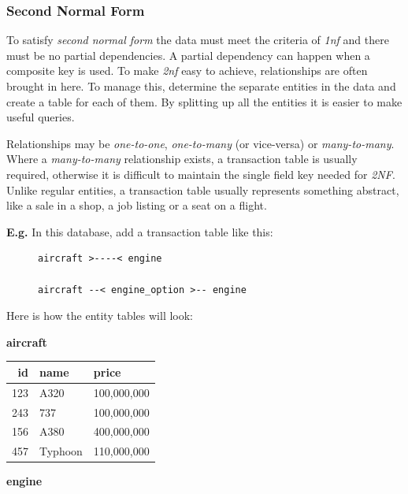 \documentclass[9pt]{article}
\begin{document}
\subsubsection{Second Normal Form}
\label{sec:orgafbaccc}

To satisfy \emph{second normal form} the data must meet  the criteria of \emph{1nf} and there must be no partial dependencies. A partial dependency can happen when a composite key is used. To make \emph{2nf} easy to achieve, relationships are often brought in here. To manage this, determine the separate entities in the data and create a table for each of them. By splitting up all the entities it is easier to make useful queries.

Relationships may be \emph{one-to-one}, \emph{one-to-many} (or vice-versa) or \emph{many-to-many}. Where a \emph{many-to-many} relationship exists, a transaction table is usually required, otherwise it is difficult to maintain the single field key needed for \emph{2NF}. Unlike regular entities, a transaction table usually represents something abstract, like a sale in a shop, a job listing or a seat on a flight.

\textbf{E.g.} In this database, add a transaction table like this:

\begin{figure}[H]
\begin{verbatim}
aircraft >----< engine

aircraft --< engine_option >-- engine
\end{verbatim}
\end{figure}

Here is how the entity tables will look:

\textbf{aircraft}

\begin{center}
\begin{tabular}{rll}
\hline
id & name & price\\
\hline
123 & A320 & 100,000,000\\
243 & 737 & 100,000,000\\
156 & A380 & 400,000,000\\
457 & Typhoon & 110,000,000\\
\hline
\end{tabular}
\end{center}

\textbf{engine}
\end{document}
